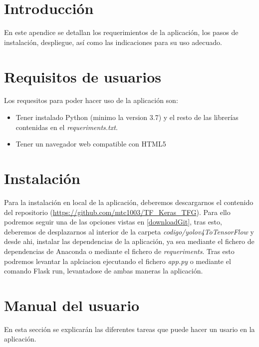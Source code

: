 
\section{Introducción}
En este apendice se detallan los requerimientos de la aplicación, los pasos de instalación, despliegue, así como las indicaciones para su uso adecuado.
\section{Requisitos de usuarios}
Los requesitos para poder hacer uso de la aplicación son:
\begin{itemize}
    \item Tener instalado Python (minimo la version 3.7) y el resto de las librerías contenidas en el \textit{requeriments.txt}.
    \item Tener un navegador web compatible con HTML5 
\end{itemize}

\section{Instalación}
Para la instalación en local de la aplicación, deberemos descargarnos el contenido del repositorio (\url{https://github.com/mtc1003/TF_Keras_TFG}).
Para ello podremos seguir una de las opciones vistas en \ref{downloadGit}, tras esto, deberemos de desplazarnos al interior de la carpeta \textit{codigo/yolov4ToTensorFlow} y desde ahi, instalar las dependencias de la aplicación, ya sea mediante el fichero de dependencias de Anaconda o mediante el fichero de \textit{requeriments}.
Tras esto podremos levantar la aplciacion ejecutando el fichero \textit{app.py} o mediante el comando Flask run, levantadose de ambas maneras la aplicación.

\section{Manual del usuario}
En esta sección se explicarán las diferentes tareas que puede hacer un usario en la aplicación.
